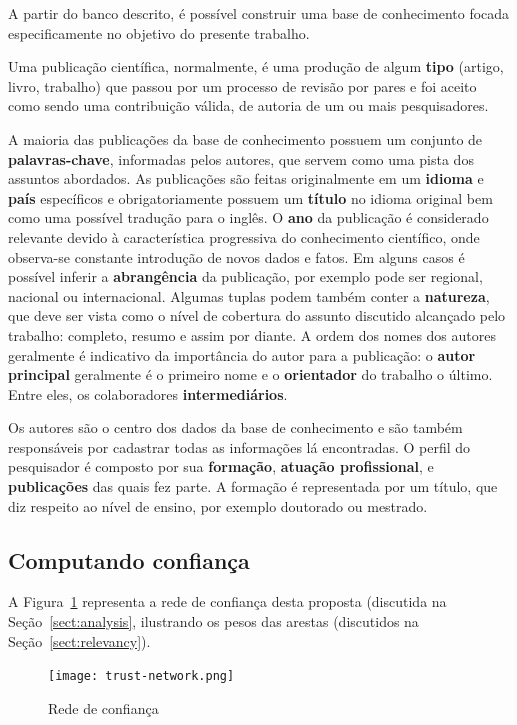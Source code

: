 \documentclass[12pt]{article}
\begin{document}
A partir do banco descrito, é possível construir uma base de conhecimento focada especificamente no objetivo do presente trabalho.

Uma publicação científica, normalmente, é uma produção de algum \textbf{tipo} (artigo, livro, trabalho) que passou por um processo de 
revisão por pares e foi aceito como sendo uma contribuição válida, de autoria de um ou mais pesquisadores. 

A maioria das publicações da base de conhecimento possuem um conjunto de \textbf{palavras-chave}, informadas pelos autores, que servem como uma pista dos assuntos abordados. As publicações são feitas originalmente em um \textbf{idioma} e \textbf{país} específicos e obrigatoriamente possuem um \textbf{título} no idioma original bem como uma possível tradução para o inglês. O \textbf{ano} da 
publicação é considerado relevante devido à característica progressiva do conhecimento científico, onde observa-se constante 
introdução de novos dados e fatos. Em alguns casos é possível inferir a \textbf{abrangência} da publicação, por exemplo pode 
ser regional, nacional ou internacional. Algumas tuplas podem também conter a \textbf{natureza}, que deve ser vista como o 
nível de cobertura do assunto discutido alcançado pelo trabalho: completo, resumo e assim por diante. A ordem dos nomes dos 
autores geralmente é indicativo da importância do autor para a publicação: o \textbf{autor principal} geralmente é o primeiro 
nome e o \textbf{orientador} do trabalho o último. Entre eles, os colaboradores \textbf{intermediários}.

Os autores são o centro dos dados da base de conhecimento e são também responsáveis por cadastrar todas as informações lá encontradas. 
O perfil do pesquisador é composto por sua \textbf{formação}, \textbf{atuação profissional}, e \textbf{publicações} das quais fez 
parte. A formação é representada por um título, que diz respeito ao nível de ensino, por exemplo doutorado ou mestrado.

\subsection{Computando confiança} \label{sect:computing-trust}

A Figura~\ref{fig:network} representa a rede de confiança desta proposta (discutida na Seção~\ref{sect:analysis}, ilustrando os pesos das arestas (discutidos na Seção~\ref{sect:relevancy}).


  \begin{figure}[ht]
    \centering
    \texttt{[image: trust-network.png]}
    \caption{Rede de confiança}
    \label{fig:network}
  \end{figure}
\end{document}
